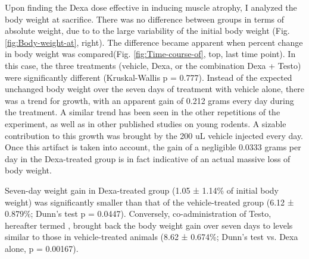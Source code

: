 \documentclass[12pt,english]{report}\usepackage[]{graphicx}\usepackage[]{color}
\begin{document}
Upon finding the Dexa dose effective in inducing muscle atrophy, I
analyzed the body weight at sacrifice. There was no difference between
groups in terms of absolute weight, due to to the large variability
of the initial body weight (Fig. \ref{fig:Body-weight-at}, right).
The difference became apparent when percent change in body weight
was compared(Fig. \ref{fig:Time-course-of}, top, last time point).
In this case, the three treatments (vehicle, Dexa, or the combination
Dexa + Testo) were significantly different (Kruskal-Wallis p = 0.777).
Instead of the expected unchanged body weight over the seven days
of treatment with vehicle alone, there was a trend for growth, with
an apparent gain of 0.212
grams every day during the treatment. A similar trend has been seen
in the other repetitions of the experiment, as well as in other published
studies on young rodents. A sizable contribution to this growth was
brought by the 200 uL vehicle injected every day. Once this artifact
is taken into account, the gain of a negligible 0.0333
grams per day in the Dexa-treated group is in fact indicative of an
actual massive loss of body weight.

Seven-day weight gain in Dexa-treated group (1.05
± 1.14\%
of initial body weight) was significantly smaller than that of the
vehicle-treated group (6.12
± 0.879\%;
Dunn's test p = 0.0447).
Conversely, co-administration of Testo, hereafter termed ,
brought back the body weight gain over seven days to levels similar
to those in vehicle-treated animals (8.62
± 0.674\%;
Dunn's test vs. Dexa alone, p = 0.00167).
\end{document}
